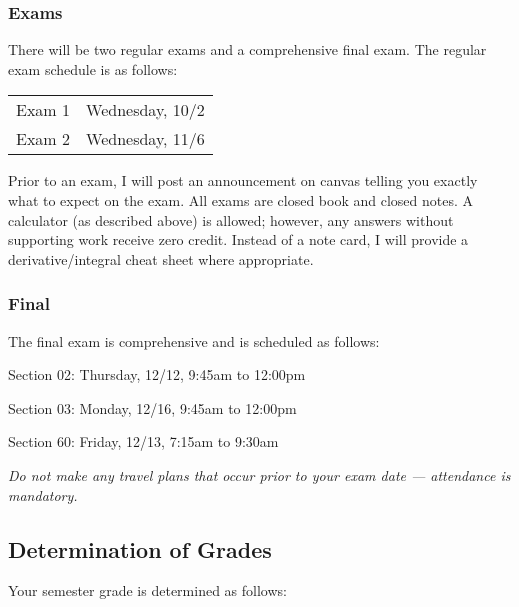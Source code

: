 \documentclass[letterpaper,12pt,fleqn]{article}
\begin{document}
\subsubsection*{Exams}

There will be two regular exams and a comprehensive final exam.  The regular exam schedule is as follows:

\bigskip

\begin{tabular}{ll}
  Exam 1 & Wednesday, 10/2 \\
  Exam 2 & Wednesday, 11/6
\end{tabular}
  
\bigskip

Prior to an exam, I will post an announcement on canvas telling you exactly what to expect on the exam.  All exams
are closed book and closed notes.  A calculator (as described above) is allowed; however, any answers without
supporting work receive zero credit.  Instead of a note card, I will provide a derivative/integral cheat sheet
where appropriate.

\subsubsection*{Final}

The final exam is comprehensive and is scheduled as follows:
\begin{description}
  \bfseries
\item{Section 02:} Thursday, 12/12, 9:45am to 12:00pm
\item{Section 03:} Monday, 12/16, 9:45am to 12:00pm
\item{Section 60:} Friday, 12/13, 7:15am to 9:30am
\end{description}
\emph{Do not make any travel plans that occur prior to your exam date --- attendance is mandatory.}

\subsection*{Determination of Grades}

Your semester grade is determined as follows:

\bigskip
\end{document}
